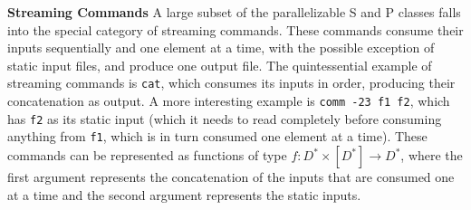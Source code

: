 \documentclass[sigplan, review, screen, anonymous]{acmart}
\newcommand{\heading}[1]{\vspace{4pt}\noindent\textbf{#1}\enspace}
\newcommand{\ttt}[1]{\texttt{#1}}
\newcommand{\cn}[1]{\mbox{\textcircled{\footnotesize #1}}}
\newcommand{\tcn}[1]{\mbox{\textcircled{\scriptsize #1}}}
\newcommand{\sta}{\cn{\textsc{S}}\xspace}
\newcommand{\pur}{\cn{\textsc{P}}\xspace}
\newcommand{\tsta}{\tcn{\textsc{S}}\xspace}
\newcommand{\tpur}{\tcn{\textsc{P}}\xspace}
\newcommand{\nv}[1]{[{\color{cyan}nv: #1}]}
\newcommand{\kk}[1]{[{\color{magenta}kk: #1}]}
\newcommand{\km}[1]{[{\color{blue}km: #1}]}
\newcommand{\kstar}{^{\textstyle *}}
\newcommand{\sys}{{\scshape PaSh}\xspace}
\begin{document}
\heading{Streaming Commands}
%
A large subset of the parallelizable \tsta and \tpur classes falls
into the special category of streaming commands. These commands
consume their inputs sequentially and one element at a time, with the
possible exception of static input files, and produce one output
file. The quintessential example of streaming commands is \ttt{cat},
which consumes its inputs in order, producing their concatenation as
output. A more interesting example is \ttt{comm -23 f1 f2}, which has
\ttt{f2} as its static input (which it needs to read completely before
consuming anything from \ttt{f1}, which is in turn consumed one
element at a time). These commands can be represented as functions of
type $f : D\kstar \times [D\kstar] \to D\kstar$, where the first
argument represents the concatenation of the inputs that are consumed
one at a time and the second argument represents the static inputs.




\end{document}
